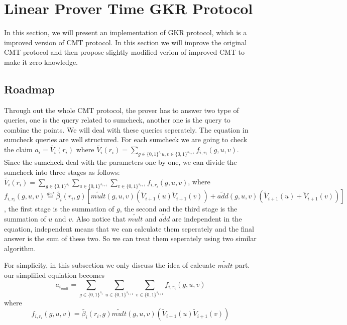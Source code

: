 \section{Linear Prover Time GKR Protocol}
In this section, we will present an implementation of GKR protocol\cite{GKR}, which is a improved version of CMT protocol\cite{CMT}. In this section we will improve the original CMT protocol and then propose slightly modified verion of improved CMT to make it zero knowledge.

\subsection{Roadmap}
Through out the whole CMT protocol, the prover has to answer two type of queries, one is the query related to sumcheck, another one is the query to combine the points. We will deal with these queries seperately. The equation in sumcheck queries are well structured. For each sumcheck we are going to check the claim $a_i=\tilde{V_i}(r_i)$ where $\tilde{V_i}(r_i)=\sum_{g\in\{0,1\}^{s_i} u, v\in \{0,1\}^{s_{i+1}}}f_{i,r_i}(g,u,v)$. Since the sumcheck deal with the parameters one by one, we can divide the sumcheck into three stages as follows: $\tilde{V_i}(r_i)=\sum_{g\in\{0,1\}^{s_i}}\sum_{u \in \{0,1\}^{s_{i+1}}} \sum_{v\in \{0,1\}^{s_{i+1}}}f_{i,r_i}(g,u,v)$, where $f_{i,r_i}(g,u,v)\overset{def}{=}\tilde{\beta_{i}}(r_i, g)[\tilde{mult}(g, u, v)(\tilde{V}_{i+1}(u)\tilde{V}_{i+1}(v))+\tilde{add}(g,u,v)(\tilde{V}_{i+1}(u)+\tilde{V}_{i+1}(v))]$, the first stage is the summation of $g$, the second and the third stage is the summation of $u$ and $v$. Also notice that $\tilde{mult}$ and $\tilde{add}$ are independent in the equation, independent means that we can calculate them seperately and the final answer is the sum of these two. So we can treat them seperately using two similar algorithm.

For simplicity, in this subsection we only discuss the idea of calcuate $\tilde{mult}$ part. our simplified equiation becomes 
$$a_{i_{mult}}=\sum_{g\in\{0,1\}^{s_i}}\sum_{u \in \{0,1\}^{s_{i+1}}} \sum_{v\in \{0,1\}^{s_{i+1}}}f_{i, r_i}(g, u, v)$$ where $$f_{i, r_i}(g, u, v)=\tilde{\beta_{i}}(r_i, g)\tilde{mult}(g, u, v)(\tilde{V}_{i+1}(u)\tilde{V}_{i+1}(v))$$


